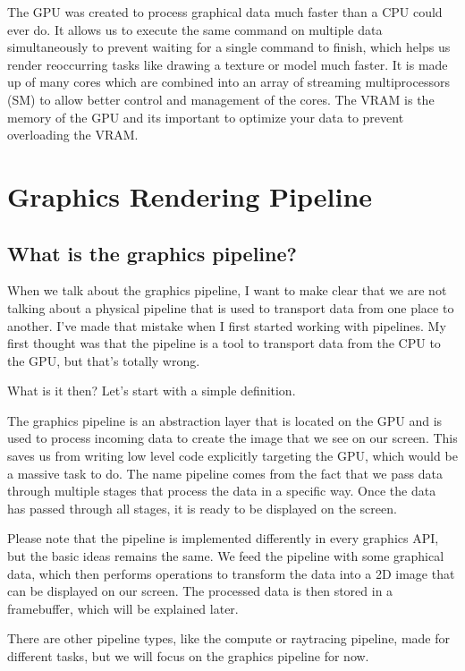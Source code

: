 \documentclass[12pt]{report} \usepackage{preamble}
\begin{document}
The GPU was created to process graphical data much faster than a CPU
could ever do. It allows us to execute the same command on multiple
data simultaneously to prevent waiting for a single command to finish,
which helps us render reoccurring tasks like drawing a texture or model
much faster.  It is made up of many cores which are combined into an
array of streaming multiprocessors (SM) to allow better control and
management of the cores.  The VRAM is the memory of the GPU and its
important to optimize your data to prevent overloading the VRAM.

\chapter{Graphics Rendering Pipeline}

\section{What is the graphics pipeline?}

When we talk about the graphics pipeline, I want to make clear that we
are not talking about a physical pipeline that is used to transport data
from one place to another. I've made that mistake when I first started
working with pipelines. My first thought was that the pipeline is a tool
to transport data from the CPU to the GPU, but that's totally wrong.

What is it then? Let's start with a simple definition.

The graphics pipeline is an abstraction layer that is located on the
GPU and is used to process incoming data to create the image that we see
on our screen. \cite{vkGuide} This saves us from writing low level code
explicitly targeting the GPU, which would be a massive task to do.
The name pipeline comes from the fact that we pass data through
multiple stages that process the data in a specific way. Once the data
has passed through all stages, it is ready to be displayed on the screen.

Please note that the pipeline is implemented differently in every graphics
API, but the basic ideas remains the same. We feed the pipeline with some
graphical data, which then performs operations to transform the data into
a 2D image that can be displayed on our screen. The processed data
is then stored in a framebuffer, which will be explained later.
\cite{vkGuide}

There are other pipeline types, like the compute or raytracing
pipeline, made for different tasks, but we will focus on the graphics
pipeline for now.
\end{document}
